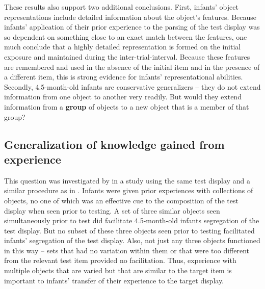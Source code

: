 These results also support two additional conclusions.  First,
infants' object representations include detailed information
about the object's features.  Because infants'
application of their prior experience to the parsing of the test
display was so dependent on something close to an exact match between
the features, one much conclude that a highly detailed representation
is formed on the initial exposure and maintained during the
inter-trial-interval.  Because these features are remembered and used
in the absence of the initial item and in the presence of a different
item, this is strong evidence for infants' representational
abilities.  Secondly, 4.5-month-old infants are conservative
generalizers -- they do not extend information from one object to
another very readily.  But would they extend information from a {\bf group}
of objects to a new object that is a member of that group?


\subsection{Generalization of knowledge gained from experience}

This question was investigated by 
in a study using the same test display and a similar procedure as in
.  Infants were given prior experiences with collections
of objects, no one of which was an effective cue to the composition of
the test display when seen prior to testing.  A set of three similar
objects seen simultaneously prior to test did facilitate 4.5-month-old
infants segregation of the test display.  But no subset of these three
objects seen prior to testing facilitated infants' segregation of the
test display.  Also, not just any three objects functioned in this way
-- sets that had no variation within them or that were too different
from the relevant test item provided no facilitation.  Thus,
experience with multiple objects that are varied but that are similar
to the target item is important to infants' transfer of their
experience to the target display.



